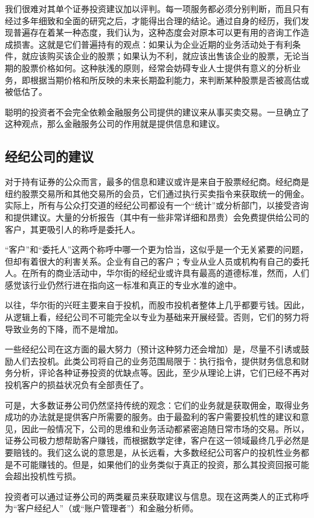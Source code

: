 \documentclass[12pt,oneside]{book}
\begin{document}
我们很难对其单个证券投资建议加以评判。每一项服务都必须分别判断，而且只有经过多年细致和全面的研究之后，才能得出合理的结论。通过自身的经历，我们发现普遍存在着某一种态度，我们认为，这种态度会对原本可以更有用的咨询工作造成损害。这就是它们普遍持有的观点：如果认为企业近期的业务活动处于有利条件，就应该购买该企业的股票；如果认为不利，就应该出售该企业的股票，无论当期的股票价格如何。这种肤浅的原则，经常会妨碍专业人士提供有意义的分析业务，即根据当期价格和所反映的未来长期盈利能力，来判断某种股票是否被高估或被低估了。

聪明的投资者不会完全依赖金融服务公司提供的建议来从事买卖交易。一旦确立了这种观点，那么金融服务公司的作用就是提供信息和建议。

\subsection{经纪公司的建议}
对于持有证券的公众而言，最多的信息和建议或许是来自于股票经纪商。经纪商是纽约股票交易所和其他交易所的会员，它们通过执行买卖指令来获取统一的佣金。实际上，所有与公众打交道的经纪公司都设有一个“统计”或分析部门，以接受咨询和提供建议。大量的分析报告（其中有一些非常详细和昂贵）会免费提供给公司的客户，其更吸引人的称呼是委托人。

“客户”和“委托人”这两个称呼中哪一个更为恰当，这似乎是一个无关紧要的问题，但却有着很大的利害关系。企业有自己的客户；专业从业人员或机构有自己的委托人。在所有的商业活动中，华尔街的经纪业或许具有最高的道德标准，然而，人们感觉该行业仍然行进在指向这一标准和真正的专业水准的途中。

以往，华尔街的兴旺主要来自于投机，而股市投机者整体上几乎都要亏钱。因此，从逻辑上看，经纪公司不可能完全以专业为基础来开展经营。否则，它们的努力将导致业务的下降，而不是增加。

一些经纪公司在这方面的最大努力（预计这种努力还会增加）是，尽量不引诱或鼓励人们去投机。此类公司将自己的业务范围局限于：执行指令，提供财务信息和财务分析，评论各种证券投资的优缺点等。因此，至少从理论上讲，它们已经不再对投机客户的损益状况负有全部责任了。

可是，大多数证券公司仍然坚持传统的观念：它们的业务就是获取佣金，取得业务成功的办法就是提供客户所需要的服务。由于最盈利的客户需要投机性的建议和意见，因此一般情况下，公司的思维和业务活动都紧密追随日常市场的交易。所以，证券公司极力想帮助客户赚钱，而根据数学定律，客户在这一领域最终几乎必然是要赔钱的。我们这么说的意思是，从长远看，大多数经纪公司客户的投机性业务都是不可能赚钱的。但是，如果他们的业务类似于真正的投资，那么其投资回报可能会超出投机性亏损。

投资者可以通过证券公司的两类雇员来获取建议与信息。现在这两类人的正式称呼为“客户经纪人”（或“账户管理者”）和金融分析师。
\end{document}
